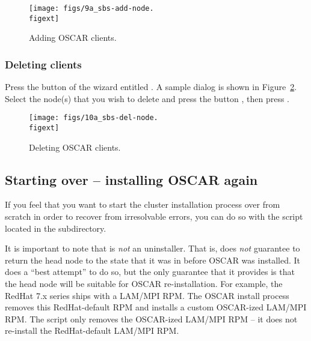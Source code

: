 \begin{figure}[htbp]
  \begin{center}
    \texttt{[image: figs/9a\_sbs-add-node.\\figext]}
    \caption{Adding OSCAR clients.}
    \label{fig:detailed-add-node}
  \end{center}
\end{figure}


\subsubsection{Deleting clients}
\label{det:deleting-clients}

Press the button of the wizard entitled .
A sample dialog is shown in Figure~\ref{fig:detailed-delete-node}.
Select the node(s) that you wish to delete and press the button
, then press .

\begin{figure}[htbp]
  \begin{center}
    \texttt{[image: figs/10a\_sbs-del-node.\\figext]}
    \caption{Deleting OSCAR clients.}
    \label{fig:detailed-delete-node}
  \end{center}
\end{figure}


\subsection{Starting over -- installing OSCAR again}

If you feel that you want to start the cluster installation process
over from scratch in order to recover from irresolvable errors, you
can do so with the  script located in the
 subdirectory.

It is important to note that  is {\em not} an
uninstaller.  That is,  does {\em not} guarantee to
return the head node to the state that it was in before OSCAR was
installed.  It does a ``best attempt'' to do so, but the only
guarantee that it provides is that the head node will be suitable for
OSCAR re-installation.  For example, the RedHat 7.x series ships with
a LAM/MPI RPM.  The OSCAR install process removes this RedHat-default
RPM and installs a custom OSCAR-ized LAM/MPI RPM.  The
 script only removes the OSCAR-ized LAM/MPI RPM -- it
does not re-install the RedHat-default LAM/MPI RPM.

